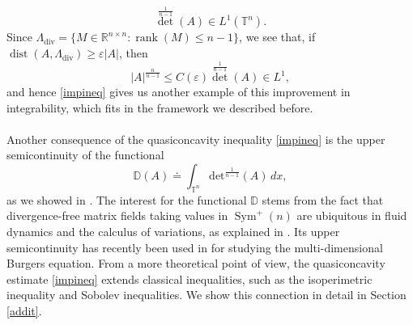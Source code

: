 \documentclass[10pt,reqno]{amsart}
\numberwithin{equation}{section}
\newcommand{\R}{\mathbb{R}}
\newcommand{\T}{\mathbb{T}}
\newcommand{\D}{\mathbb{D}}
\newcommand{\eps}{\varepsilon}
\DeclareMathOperator{\rank}{rank}
\DeclareMathOperator{\dv}{div}
\DeclareMathOperator{\Sym}{Sym}
\DeclareMathOperator{\dist}{dist}
\theoremstyle{plain}
\theoremstyle{definition}
\theoremstyle{remark}
\begin{document}
\[
{\det}^\frac{1}{n-1}(A) \in L^1(\T^n).
\]
Since $\Lambda_{\dv} = \{M \in \R^{n\times n}: \rank(M) \le n -1\}$, we see that, if $\dist(A,\Lambda_{\dv}) \ge \eps|A|$, then
\[
|A|^\frac{n}{n-1} \le C(\eps){\det}^\frac{1}{n-1}(A) \in L^1,
\]
and hence \eqref{impineq} gives us another example of this improvement in integrability, which fits in the framework we described before.
\\
\\
Another consequence of the quasiconcavity inequality \eqref{impineq} is the upper semicontinuity of the functional 
\begin{equation}\label{Definition_main_functional}
\D(A) \doteq \int_{\T^n}\text{det}^\frac{1}{n-1}(A)\,dx,
\end{equation}
 as we showed in \cite{USC}.  The interest for the functional $\D$ stems from the fact that divergence-free matrix fields taking values in $\Sym^+(n)$ are ubiquitous in fluid dynamics and the calculus of variations, as explained in \cite{SER}. Its upper semicontinuity has recently been used in \cite{USC, SER20} for studying the multi-dimensional Burgers equation. From a more theoretical point of view, the quasiconcavity estimate \eqref{impineq} extends classical inequalities, such as the isoperimetric inequality and Sobolev inequalities. We show this connection in detail in Section \ref{addit}.\\
 
\end{document}
